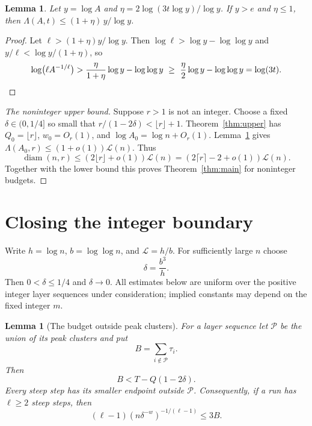 \documentclass[11pt]{amsart}
\newtheorem{lemma}[theorem]{Lemma}
\theoremstyle{definition}
\theoremstyle{remark}
\newcommand{\diam}{\operatorname{diam}}
\newcommand{\Lz}{\mathcal{L}}
\begin{document}
\begin{lemma}\label{lem:lambda}
Let $y=\log A$ and $\eta=2\log(3t\log y)/\log y$. If $y>e$ and $\eta\le1$, then $\Lambda(A,t)\le(1+\eta)\,y/\log y$.
\end{lemma}

\begin{proof}
Let $\ell>(1+\eta)y/\log y$. Then $\log\ell>\log y-\log\log y$ and $y/\ell<\log y/(1+\eta)$, so
\[
\log\bigl(\ell A^{-1/\ell}\bigr)>\frac{\eta}{1+\eta}\log y-\log\log y\ \ge\ \frac\eta2\log y-\log\log y=\log(3t).\qedhere
\]
\end{proof}


\begin{proof}[The noninteger upper bound]
Suppose $r>1$ is not an integer. Choose a fixed
$\delta\in(0,1/4]$ so small that
$r/(1-2\delta)<\lfloor r\rfloor+1$. Theorem~\ref{thm:upper} has
$Q_0=\lfloor r\rfloor$, $w_0=O_r(1)$, and
$\log A_0=\log n+O_r(1)$. Lemma~\ref{lem:lambda} gives
$\Lambda(A_0,r)\le(1+o(1))\Lz(n)$. Thus
\[
 \diam(n,r)\le(2\lfloor r\rfloor+o(1))\Lz(n)
             =(2\lceil r\rceil-2+o(1))\Lz(n).
\]
Together with the lower bound this proves Theorem~\ref{thm:main} for
noninteger budgets.
\end{proof}
\section{Closing the integer boundary}\label{sec:integer}

Write $h=\log n$, $b=\log\log n$, and $\mathcal L=h/b$.
For sufficiently large $n$ choose
\[
 \delta=\frac{b^3}{h}.
\]
Then $0<\delta\le1/4$ and $\delta\to0$.
All estimates below are uniform over the positive integer layer sequences
under consideration; implied constants may depend on the fixed integer $m$.

\begin{lemma}[The budget outside peak clusters]\label{lem:residual}
For a layer sequence let $\mathcal P$ be the union of its peak clusters and put
\[
 B=\sum_{i\notin\mathcal P}\tau_i.
\]
Then
\[
 B<T-Q(1-2\delta).
\]
Every steep step has its smaller endpoint outside $\mathcal P$.
Consequently, if a run has $\ell\ge2$ steep steps, then
\[
 (\ell-1)(n\delta^{-w})^{-1/(\ell-1)}\le3B.
\]
\end{lemma}
\end{document}
